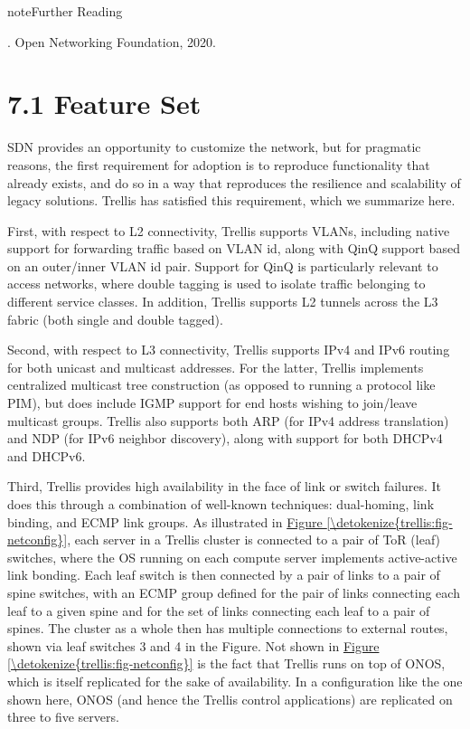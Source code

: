 \documentclass[letterpaper,11pt,english]{sphinxmanual}
\begin{document}
\label{\detokenize{trellis:reading-trellis}}
\begin{sphinxadmonition}{note}{Further Reading}

. Open Networking
Foundation, 2020.
\end{sphinxadmonition}


\section{7.1 Feature Set}
\label{\detokenize{trellis:feature-set}}
SDN provides an opportunity to customize the network, but for
pragmatic reasons, the first requirement for adoption is to reproduce
functionality that already exists, and do so in a way that reproduces
the resilience and scalability of legacy solutions. Trellis has
satisfied this requirement, which we summarize here.

First, with respect to L2 connectivity, Trellis supports VLANs,
including native support for forwarding traffic based on VLAN id,
along with QinQ support based on an outer/inner VLAN id pair. Support
for QinQ is particularly relevant to access networks, where double
tagging is used to isolate traffic belonging to different service
classes. In addition, Trellis supports L2 tunnels across the L3 fabric
(both single and double tagged).

Second, with respect to L3 connectivity, Trellis supports IPv4 and
IPv6 routing for both unicast and multicast addresses. For the latter,
Trellis implements centralized multicast tree construction (as opposed
to running a protocol like PIM), but does include IGMP support for end
hosts wishing to join/leave multicast groups. Trellis also supports
both ARP (for IPv4 address translation) and NDP (for IPv6 neighbor
discovery), along with support for both DHCPv4 and DHCPv6.

Third, Trellis provides high availability in the face of link or
switch failures. It does this through a combination of well-known
techniques: dual-homing, link binding, and ECMP link groups. As
illustrated in \hyperref[\detokenize{trellis:fig-netconfig}]{Figure \ref{\detokenize{trellis:fig-netconfig}}}, each server in a
Trellis cluster is connected to a pair of ToR (leaf) switches, where
the OS running on each compute server implements active-active link
bonding. Each leaf switch is then connected by a pair of links to a
pair of spine switches, with an ECMP group defined for the pair of
links connecting each leaf to a given spine and for the set of links
connecting each leaf to a pair of spines. The cluster as a whole then
has multiple connections to external routes, shown via leaf switches 3
and 4 in the Figure. Not shown in \hyperref[\detokenize{trellis:fig-netconfig}]{Figure \ref{\detokenize{trellis:fig-netconfig}}}
is the fact that Trellis runs on top of ONOS, which is itself
replicated for the sake of availability. In a configuration like the
one shown here, ONOS (and hence the Trellis control applications) are
replicated on three to five servers.
\end{document}
